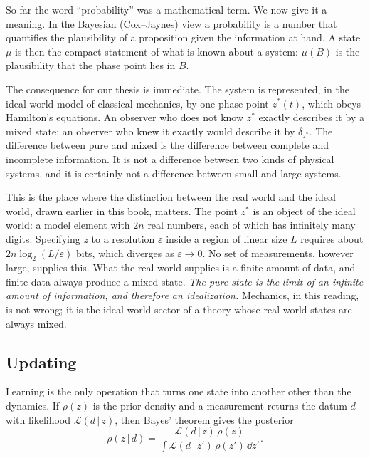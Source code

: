 So far the word ``probability'' was a mathematical term. We now give it a meaning. In the Bayesian (Cox--Jaynes) view a probability is a number that quantifies the plausibility of a proposition given the information at hand. A state $\mu$ is then the compact statement of what is known about a system: $\mu(B)$ is the plausibility that the phase point lies in $B$.

The consequence for our thesis is immediate. The system is represented, in the ideal-world model of classical mechanics, by one phase point $z^*(t)$, which obeys Hamilton's equations. An observer who does not know $z^*$ exactly describes it by a mixed state; an observer who knew it exactly would describe it by $\delta_{z^*}$. The difference between pure and mixed is the difference between complete and incomplete information. It is not a difference between two kinds of physical systems, and it is certainly not a difference between small and large systems.

This is the place where the distinction between the real world and the ideal world, drawn earlier in this book, matters. The point $z^*$ is an object of the ideal world: a model element with $2n$ real numbers, each of which has infinitely many digits. Specifying $z$ to a resolution $\varepsilon$ inside a region of linear size $L$ requires about $2n\log_2(L/\varepsilon)$ bits, which diverges as $\varepsilon\to0$. No set of measurements, however large, supplies this. What the real world supplies is a finite amount of data, and finite data always produce a mixed state. \emph{The pure state is the limit of an infinite amount of information, and therefore an idealization.} Mechanics, in this reading, is not wrong; it is the ideal-world sector of a theory whose real-world states are always mixed.

\subsection{Updating}

Learning is the only operation that turns one state into another other than the dynamics. If $\rho(z)$ is the prior density and a measurement returns the datum $d$ with likelihood $\mathcal L(d\,|\,z)$, then Bayes' theorem gives the posterior
\begin{equation}
\rho(z\,|\,d)=\frac{\mathcal L(d\,|\,z)\,\rho(z)}{\int\mathcal L(d\,|\,z')\,\rho(z')\,\dd z'}.
\label{eq:bayes}
\end{equation}

